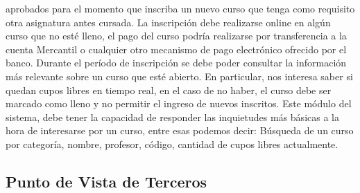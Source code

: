 \message{ !name(InformeFase2.tex)}\documentclass[12pt,a4paper,spanish]{article}
\begin{document}
aprobados para el momento que inscriba un nuevo curso que tenga como
requisito otra asignatura antes cursada. 
\newline
\newline
\indent La inscripci\'on debe realizarse online en alg\'un curso
que no est\'e lleno, el pago del curso podr\'ia realizarse por
transferencia a la cuenta Mercantil o cualquier otro mecanismo de pago
electr\'onico ofrecido por el banco.
\newline
\newline
\indent Durante el per\'iodo de inscripci\'on  se debe poder
consultar la informaci\'on m\'as relevante sobre un curso que est\'e
abierto. En particular, nos interesa saber si quedan cupos libres en
tiempo real, en el caso de no haber, el curso debe ser marcado como lleno y no permitir el ingreso de nuevos inscritos. 
\newline
\newline
\indent Este m\'odulo del sistema, debe tener la capacidad de
responder las inquietudes m\'as b\'asicas a la hora de interesarse por
un curso, entre esas podemos decir: B\'usqueda de un curso por
categor\'ia, nombre, profesor, c\'odigo, cantidad de cupos libres
actualmente. 
\newline
\newline
\newpage
\subsection{Punto de Vista de Terceros}
\end{document}
